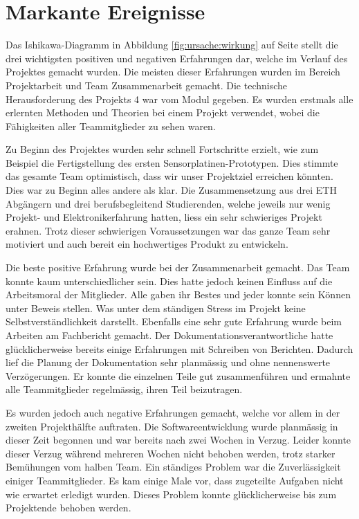 \chapter{Markante Ereignisse}
\label{chap:markant}

Das  Ishikawa-Diagramm   in  Abbildung  \ref{fig:ursache:wirkung}   auf  Seite
\pageref{fig:ursache:wirkung}  stellt  die   drei  wichtigsten  positiven  und
negativen Erfahrungen dar, welche im Verlauf des Projektes gemacht wurden. Die
meisten  dieser   Erfahrungen  wurden   im  Bereich  Projektarbeit   und  Team
Zusammenarbeit gemacht. Die technische Herausforderung  des Projekts 4 war vom
Modul gegeben. Es  wurden erstmals  alle erlernten  Methoden und  Theorien bei
einem Projekt verwendet, wobei die F\"ahigkeiten aller Teammitglieder zu sehen
waren.

Zu  Beginn  des  Projektes  wurden  sehr  schnell  Fortschritte  erzielt,  wie
zum  Beispiel die  Fertigstellung  des ersten  Sensorplatinen-Prototypen. Dies
stimmte das  gesamte Team optimistisch,  dass wir unser  Projektziel erreichen
k\"onnten. Dies war zu  Beginn alles andere als  klar. Die Zusammensetzung aus
drei ETH  Abg\"angern und  drei berufsbegleitend Studierenden,  welche jeweils
nur wenig Projekt- und Elektronikerfahrung  hatten, liess ein sehr schwieriges
Projekt erahnen. Trotz  dieser schwierigen Voraussetzungen war  das ganze Team
sehr motiviert und auch bereit ein hochwertiges Produkt zu entwickeln.

Die beste  positive Erfahrung wurde  bei der Zusammenarbeit  gemacht. Das Team
konnte kaum unterschiedlicher sein. Dies hatte  jedoch keinen Einfluss auf die
Arbeitsmoral  der Mitglieder. Alle  gaben  ihr Bestes  und  jeder konnte  sein
K\"onnen unter  Beweis stellen. Was  unter dem  st\"andigen Stress  im Projekt
keine Selbstverst\"andlichkeit  darstellt. Ebenfalls eine sehr  gute Erfahrung
wurde beim Arbeiten  am Fachbericht gemacht. Der Dokumentationsverantwortliche
hatte  gl\"ucklicherweise   bereits  einige  Erfahrungen  mit   Schreiben  von
Berichten. Dadurch  lief  die  Planung  der  Dokumentation  sehr  planm\"assig
und  ohne  nennenswerte Verz\"ogerungen. Er  konnte  die  einzelnen Teile  gut
zusammenf\"uhren und  ermahnte alle  Teammitglieder regelm\"assig,  ihren Teil
beizutragen.

Es wurden  jedoch auch negative Erfahrungen  gemacht, welche vor allem  in der
zweiten Projekth\"alfte auftraten. Die  Softwareentwicklung wurde planm\"assig
in dieser  Zeit begonnen und  war bereits  nach zwei Wochen  in Verzug. Leider
konnte dieser  Verzug w\"ahrend  mehreren Wochen  nicht behoben  werden, trotz
starker  Bem\"uhungen  vom  halben   Team. Ein  st\"andiges  Problem  war  die
Zuverl\"assigkeit  einiger  Teammitglieder. Es  kam   einige  Male  vor,  dass
zugeteilte Aufgaben nicht wie  erwartet erledigt wurden. Dieses Problem konnte
gl\"ucklicherweise bis zum Projektende behoben werden.

